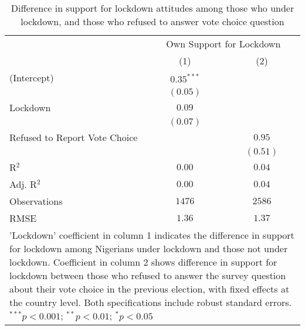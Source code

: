 
\begin{table}
\caption{Difference in support for lockdown attitudes among those who under lockdown, and those who refused to answer vote choice question}
\begin{center}
\begin{tabular}{l c c}
\hline
 & \multicolumn{2}{c}{Own Support for Lockdown} \\
\cline{2-3}
 & (1) & (2) \\
\hline
(Intercept)                   & $0.35^{***}$ &          \\
                              & $(0.05)$     &          \\
Lockdown                      & $0.09$       &          \\
                              & $(0.07)$     &          \\
Refused to Report Vote Choice &              & $0.95$   \\
                              &              & $(0.51)$ \\
\hline
R$^2$                         & $0.00$       & $0.04$   \\
Adj. R$^2$                    & $0.00$       & $0.04$   \\
Observations                  & $1476$       & $2586$   \\
RMSE                          & $1.36$       & $1.37$   \\
\hline
\multicolumn{3}{l}{\scriptsize{'Lockdown' coefficient in column 1 indicates the difference in support for lockdown among Nigerians under lockdown and those not under lockdown. Coefficient in column 2 shows difference in support for lockdown between those who refused to answer the survey question about their vote choice in the previous election, with fixed effects at the country level. Both specifications include robust standard errors. $^{***}p<0.001$; $^{**}p<0.01$; $^{*}p<0.05$}}
\end{tabular}
\label{tab_na_vote}
\end{center}
\end{table}

